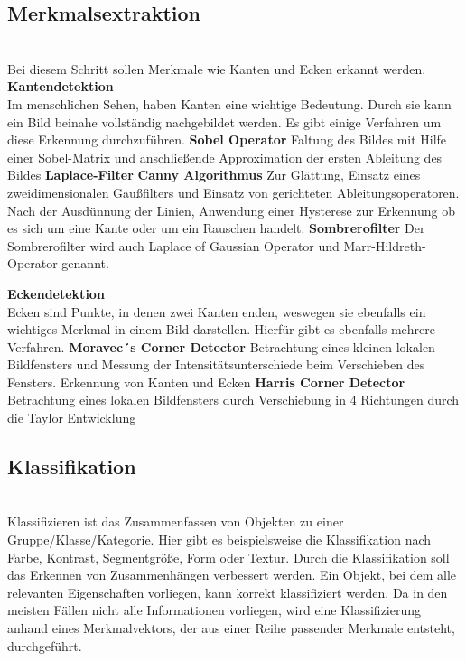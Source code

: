     \subsection*{Merkmalsextraktion}\\
    Bei diesem Schritt sollen Merkmale wie Kanten und Ecken erkannt werden.
    \textbf{Kantendetektion}\\

    Im menschlichen Sehen, haben Kanten eine wichtige Bedeutung. Durch sie kann ein Bild beinahe vollständig nachgebildet werden. Es gibt einige Verfahren um diese Erkennung durchzuführen.
    \textbf{Sobel Operator} Faltung des Bildes mit Hilfe einer Sobel-Matrix und anschließende Approximation der ersten Ableitung des Bildes
    \textbf{Laplace-Filter}
    \textbf{Canny Algorithmus} Zur Glättung, Einsatz eines zweidimensionalen Gaußfilters und Einsatz von gerichteten Ableitungsoperatoren. Nach der Ausdünnung der Linien, Anwendung einer Hysterese zur Erkennung ob es sich um eine Kante oder um ein Rauschen handelt.
    \textbf{Sombrerofilter} Der Sombrerofilter wird auch Laplace of Gaussian Operator und Marr-Hildreth-Operator genannt.

    \textbf{Eckendetektion}\\
    Ecken sind Punkte, in denen zwei Kanten enden, weswegen sie ebenfalls ein wichtiges Merkmal in einem Bild darstellen. Hierfür gibt es ebenfalls mehrere Verfahren.
    \textbf{Moravec´s Corner Detector} Betrachtung eines kleinen lokalen Bildfensters und Messung der Intensitätsunterschiede beim Verschieben des Fensters. Erkennung von Kanten und Ecken
    \textbf{Harris Corner Detector} Betrachtung eines lokalen Bildfensters durch Verschiebung in 4 Richtungen durch die Taylor Entwicklung

    \subsection*{Klassifikation}\\
    Klassifizieren ist das Zusammenfassen von Objekten zu einer Gruppe/Klasse/Kategorie. Hier gibt es beispielsweise die Klassifikation nach Farbe, Kontrast, Segmentgröße, Form oder Textur. Durch die Klassifikation soll das Erkennen von Zusammenhängen verbessert werden. Ein Objekt, bei dem alle relevanten Eigenschaften vorliegen, kann korrekt klassifiziert werden. Da in den meisten Fällen nicht alle Informationen vorliegen, wird eine Klassifizierung anhand eines Merkmalvektors, der aus einer Reihe passender Merkmale entsteht, durchgeführt. \cite{Bildverarbeitung}

